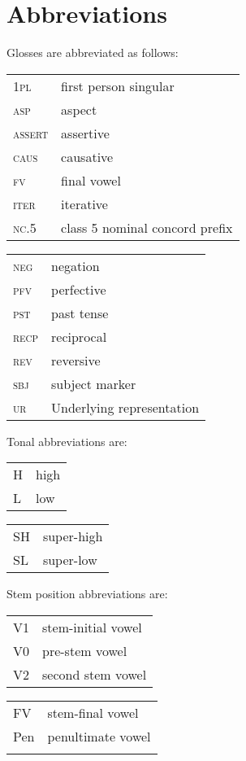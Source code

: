 \documentclass[output=paper,newtxmath,modfonts,nonflat,hidelinks]{langsci/langscibook}
\begin{document}
\section*{Abbreviations}
 
 
 
 
 
Glosses are abbreviated as follows:\\
\medskip

\begin{tabularx}{.45\textwidth}{lQ} 
\textsc{1pl}    &    {first person} singular\\
\textsc{asp}    &    {aspect}\\
\textsc{assert}  &    assertive\\
\textsc{caus}  &    causative\\
\textsc{fv}    &    {final vowel}\\
\textsc{iter}    &  iterative\\
\textsc{nc}.5   &   class 5 nominal concord prefix\\ 
\end{tabularx}
\begin{tabularx}{.45\textwidth}{lQ}
\textsc{neg}    &   {negation}\\
\textsc{pfv}    &   {perfective}\\
\textsc{pst}    &   {past tense}\\
\textsc{recp}  &   reciprocal\\
\textsc{rev}  &   reversive\\
\textsc{sbj}  &  {subject marker} \\
\textsc{ur}  &   {Underlying representation}  
\end{tabularx}
\smallskip

 
\noindent Tonal abbreviations are:
\smallskip


\begin{tabularx}{.45\textwidth}{lQ}
H     &  high\\
L     &  low\\
\end{tabularx}
\begin{tabularx}{.45\textwidth}{lQ}
SH  &  super-high\\
SL   &  super-low
\end{tabularx}
\smallskip


\noindent Stem position abbreviations are:
\smallskip


\begin{tabularx}{.45\textwidth}{lQ}
V1 & stem-initial vowel\\
V0 & pre-stem vowel\\
V2 & second stem vowel\\
\end{tabularx}
\begin{tabularx}{.45\textwidth}{lQ}
FV & stem-{final vowel}\\
Pen & penultimate vowel\\
\\
\end{tabularx}



\sloppy

\printbibliography[heading=subbibliography,notkeyword=this]

\fussy
\end{document}
